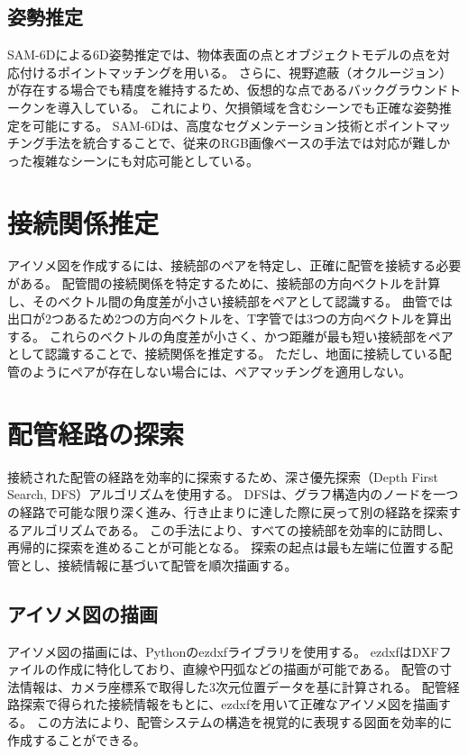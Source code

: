 \subsection{姿勢推定}
SAM-6Dによる6D姿勢推定では、物体表面の点とオブジェクトモデルの点を対応付けるポイントマッチングを用いる。
さらに、視野遮蔽（オクルージョン）が存在する場合でも精度を維持するため、仮想的な点であるバックグラウンドトークンを導入している。
これにより、欠損領域を含むシーンでも正確な姿勢推定を可能にする。
SAM-6Dは、高度なセグメンテーション技術とポイントマッチング手法を統合することで、従来のRGB画像ベースの手法では対応が難しかった複雑なシーンにも対応可能としている。



\section{接続関係推定}
アイソメ図を作成するには、接続部のペアを特定し、正確に配管を接続する必要がある。
配管間の接続関係を特定するために、接続部の方向ベクトルを計算し、そのベクトル間の角度差が小さい接続部をペアとして認識する。
曲管では出口が2つあるため2つの方向ベクトルを、T字管では3つの方向ベクトルを算出する。
これらのベクトルの角度差が小さく、かつ距離が最も短い接続部をペアとして認識することで、接続関係を推定する。
ただし、地面に接続している配管のようにペアが存在しない場合には、ペアマッチングを適用しない。

\section{配管経路の探索} 
接続された配管の経路を効率的に探索するため、深さ優先探索（Depth First Search, DFS）アルゴリズムを使用する。
DFSは、グラフ構造内のノードを一つの経路で可能な限り深く進み、行き止まりに達した際に戻って別の経路を探索するアルゴリズムである。
この手法により、すべての接続部を効率的に訪問し、再帰的に探索を進めることが可能となる。
探索の起点は最も左端に位置する配管とし、接続情報に基づいて配管を順次描画する。

\subsection{アイソメ図の描画} 
アイソメ図の描画には、Pythonのezdxfライブラリを使用する。
ezdxfはDXFファイルの作成に特化しており、直線や円弧などの描画が可能である。
配管の寸法情報は、カメラ座標系で取得した3次元位置データを基に計算される。
配管経路探索で得られた接続情報をもとに、ezdxfを用いて正確なアイソメ図を描画する。
この方法により、配管システムの構造を視覚的に表現する図面を効率的に作成することができる。


